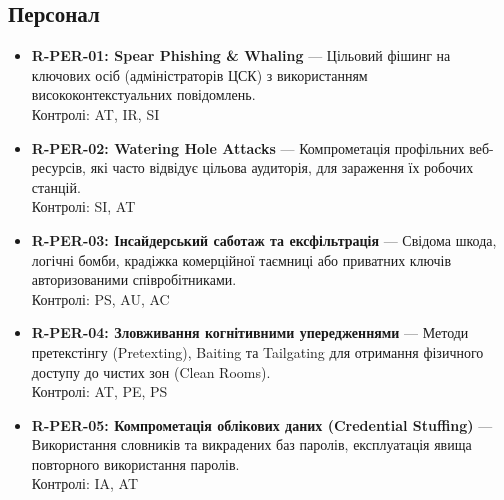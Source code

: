 \documentclass{article}
\begin{document}
\subsection{Персонал}
\begin{itemize}
\item \textbf{R-PER-01: Spear Phishing \& Whaling} — Цільовий фішинг на ключових осіб (адміністраторів ЦСК) з використанням висококонтекстуальних повідомлень.
\\ Контролі: AT, IR, SI
\item \textbf{R-PER-02: Watering Hole Attacks} — Компрометація профільних веб-ресурсів, які часто відвідує цільова аудиторія, для зараження їх робочих станцій.
\\ Контролі: SI, AT
\item \textbf{R-PER-03: Інсайдерський саботаж та ексфільтрація} — Свідома шкода, логічні бомби, крадіжка комерційної таємниці або приватних ключів авторизованими співробітниками.
\\ Контролі: PS, AU, AC
\item \textbf{R-PER-04: Зловживання когнітивними упередженнями} — Методи претекстінгу (Pretexting), Baiting та Tailgating для отримання фізичного доступу до чистих зон (Clean Rooms).
\\ Контролі: AT, PE, PS
\item \textbf{R-PER-05: Компрометація облікових даних (Credential Stuffing)} — Використання словників та викрадених баз паролів, експлуатація явища повторного використання паролів.
\\ Контролі: IA, AT\end{itemize}
\end{document}
